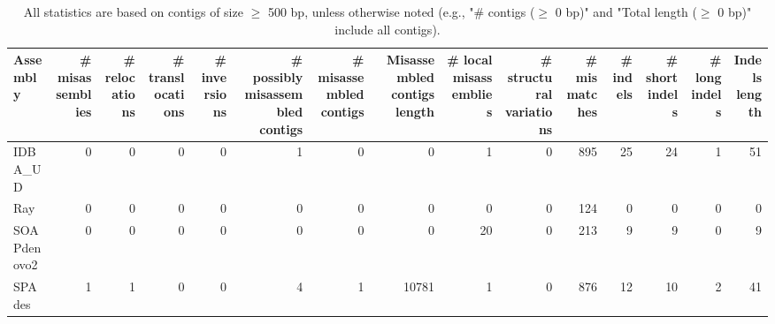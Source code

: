 \documentclass[12pt,a4paper]{article}
\begin{document}
\begin{table}[ht]
\begin{center}
\caption{All statistics are based on contigs of size $\geq$ 500 bp, unless otherwise noted (e.g., "\# contigs ($\geq$ 0 bp)" and "Total length ($\geq$ 0 bp)" include all contigs).}
\begin{tabular}{|l*{14}{|r}|}
\hline
Assembly & \# misassemblies &     \# relocations &     \# translocations &     \# inversions & \# possibly misassembled contigs & \# misassembled contigs & Misassembled contigs length & \# local misassemblies & \# structural variations & \# mismatches & \# indels &     \# short indels &     \# long indels & Indels length \\ \hline
IDBA\_UD & 0 & 0 & 0 & 0 & 1 & 0 & 0 & 1 & 0 & 895 & 25 & 24 & 1 & 51 \\ \hline
Ray & 0 & 0 & 0 & 0 & 0 & 0 & 0 & 0 & 0 & 124 & 0 & 0 & 0 & 0 \\ \hline
SOAPdenovo2 & 0 & 0 & 0 & 0 & 0 & 0 & 0 & 20 & 0 & 213 & 9 & 9 & 0 & 9 \\ \hline
SPAdes & 1 & 1 & 0 & 0 & 4 & 1 & 10781 & 1 & 0 & 876 & 12 & 10 & 2 & 41 \\ \hline
\end{tabular}
\end{center}
\end{table}
\end{document}
